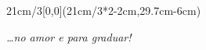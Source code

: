 \begin{textblock*}{21cm/3}[0,0](21cm/3*2-2cm,29.7cm-6cm)
  \begin{flushright}
    {\emph{
      \ldots no amor e para graduar!}
    }
  \end{flushright}
\end{textblock*}

\null\newpage

